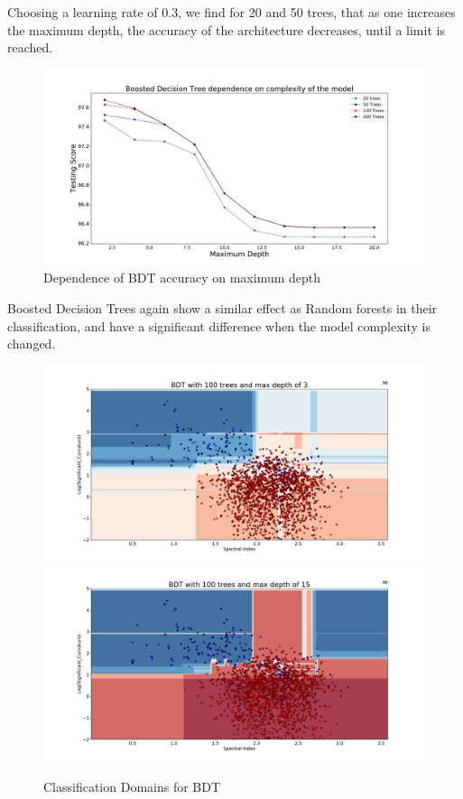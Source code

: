 Choosing a learning rate of 0.3, we find for 20 and 50 trees, that as one increases the maximum depth, the accuracy of the architecture decreases, until a limit is reached.\\
\begin{figure}[h]
\includegraphics[width=\twopicsp\textwidth]{plots/assoc_complex.pdf}
\caption{Dependence of BDT accuracy on maximum depth}
\label{fig:Maps_data}
\end{figure}

Boosted Decision Trees again show a similar effect as Random forests in their classification, and have a significant difference when the model complexity is changed.\\


\begin{figure}[h]
\includegraphics[width=\twopicsp\textwidth]{plots/classdom_bdt_100_3.pdf}
\includegraphics[width=\twopicsp\textwidth]{plots/classdom_bdt_100_15.pdf}
\caption{Classification Domains for BDT}
\label{fig:Maps_data}
\end{figure}
